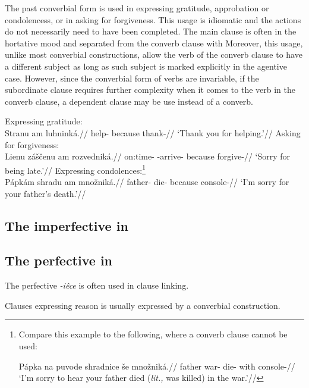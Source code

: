 The past converbial form is used in expressing gratitude, approbation or condolencess, or in asking for forgiveness. This usage is idiomatic and the actions do not necessarily need to have been completed. The main clause is often in the hortative mood and separated from the converb clause with  Moreover, this usage, unlike most converbial constructions, allow the verb of the converb clause to have a different subject as long as such subject is marked explicitly in the agentive case. However, since the converbial form of verbs are invariable, if the subordinate clause requires further complexity when it comes to the verb in the converb clause, a dependent  clause may be use instead of a converb.

\pex
\a Expressing gratitude:\\
\begingl
\gla Stranu am luhnink\'a.//
\glb help- because thank-//
\glft `Thank you for helping.'//
\endgl
\a Asking for forgiveness:\\
\begingl
\gla Lienu z\'a\v{s}\v{c}enu am rozvednik\'a.//
\glb on:time- -arrive- because forgive-//
\glft `Sorry for being late.'//
\endgl
\a Expressing condolences:\footnote{Compare this example to the following, where a converb clause cannot be used:

\ex[lingstyle=fnex,belowexskip=-1em]
\begingl
\gla P\'apka na puvode shradnice \v{s}e mno\v{z}nik\'a.//
\glb father  war- die- with console-//
\glft `I'm sorry to hear your father died (\emph{lit.,} was killed) in the war.'//
\endgl\xe}\\
\begingl
\gla P\'apk\'am shradu am mno\v{z}nik\'a.//
\glb father- die- because console-//
\glft `I'm sorry for your father's death.'//
\endgl
\xe


\subsection{The imperfective in }



\subsection{The perfective in }

The perfective \textit{-iêce} is often used in clause linking.

Clauses expressing reason is usually expressed by a converbial construction.

